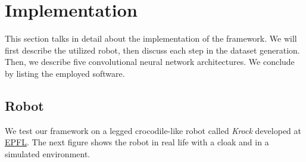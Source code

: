 \documentclass[../document.tex]{subfiles}
\begin{document}
\chapter{Implementation}
\label{chap: implementation}
This section talks in detail about the implementation of the framework. We will first describe the utilized robot, then discuss each step in the dataset generation. Then, we describe five convolutional neural network architectures.  We conclude by listing the employed software.
\section{Robot}
We test our framework on a legged crocodile-like robot called \emph{Krock} developed at \href{https://biorob.epfl.ch/}{EPFL}. The next figure shows the robot in real life with a cloak and in a simulated environment.
\end{document}
